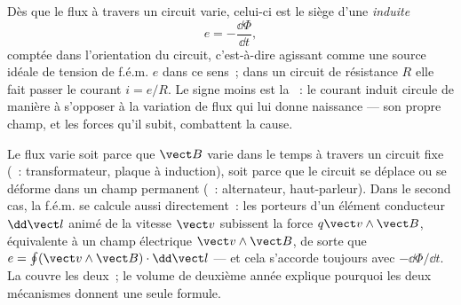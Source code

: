 \begin{theorem}\label{thm:b1:induction:faraday}
Dès que le flux à travers un circuit varie, celui-ci est le siège d'une
\emph{ induite}
\[
e = -\frac{\dd\Phi}{\dd t} ,
\]
comptée dans l'orientation du circuit, c'est-à-dire agissant comme une source
idéale de tension de f.é.m. $e$ dans ce sens~; dans un circuit de résistance $R$
elle fait passer le courant $i = e/R$. Le signe moins est la \emph{}~:
le courant induit circule de manière à s'opposer à la variation de flux qui lui
donne naissance --- son propre champ, et les forces qu'il subit, combattent la cause.
\end{theorem}
\admitted

\begin{remark}\label{rem:b1:induction:twofaces}
Le flux varie soit parce que $\vect B$ varie dans le temps à travers un circuit
fixe (\emph{}~: transformateur, plaque à induction), soit
parce que le circuit se déplace ou se déforme dans un champ permanent
(\emph{}~: alternateur, haut-parleur). Dans le second cas,
la f.é.m. se calcule aussi directement~: les porteurs d'un élément conducteur
$\dd\vect l$ animé de la vitesse $\vect v$ subissent la force $q\vect v\wedge
\vect B$, équivalente à un champ électrique $\vect v\wedge\vect B$, de sorte que
$e = \oint(\vect v\wedge\vect B)\cdot\dd\vect l$ --- et cela s'accorde toujours
avec $-\dd\Phi/\dd t$. La  couvre les deux~; le volume de
deuxième année explique pourquoi les deux mécanismes donnent une seule formule.
\end{remark}

